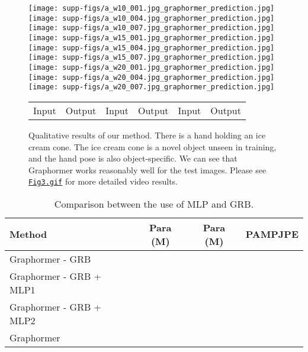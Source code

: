 \begin{figure*}
\begin{center}
\texttt{[image: supp-figs/a\_w10\_001.jpg\_graphormer\_prediction.jpg]}
\texttt{[image: supp-figs/a\_w10\_004.jpg\_graphormer\_prediction.jpg]}
\texttt{[image: supp-figs/a\_w10\_007.jpg\_graphormer\_prediction.jpg]}
\texttt{[image: supp-figs/a\_w15\_001.jpg\_graphormer\_prediction.jpg]}
\texttt{[image: supp-figs/a\_w15\_004.jpg\_graphormer\_prediction.jpg]}
\texttt{[image: supp-figs/a\_w15\_007.jpg\_graphormer\_prediction.jpg]}
\texttt{[image: supp-figs/a\_w20\_001.jpg\_graphormer\_prediction.jpg]}
\texttt{[image: supp-figs/a\_w20\_004.jpg\_graphormer\_prediction.jpg]}
\texttt{[image: supp-figs/a\_w20\_007.jpg\_graphormer\_prediction.jpg]}
\vspace{-2mm}
\setlength{\tabcolsep}{30pt}
\begin{tabular}{cccccc}
Input & Output &  Input & Output &  Input & Output
\end{tabular}
\caption{
Qualitative results of our method. There is a hand holding an ice cream cone. The ice cream cone is a novel object unseen in training, and the hand pose is also object-specific. We can see that Graphormer works reasonably well for the test images. Please see  \href{https://github.com/microsoft/MeshGraphormer/blob/main/docs/Fig3.gif}{\texttt{Fig3.gif}} for more detailed video results.
} 
\label{fig:vis_hand_3}
\vspace{-2mm}
\end{center}
\end{figure*} 

\begin{table*}
\centering
\begin{tabular}{lccc}
    \toprule
	Method  & Para (M) &  Para (M) & PAMPJPE  \\
	\midrule
	Graphormer - GRB &  &  & \\
	Graphormer - GRB + MLP1 &  &  & \\
    Graphormer - GRB + MLP2 &  &  & \\
	\midrule
	Graphormer &  &  & \\
	\bottomrule
\end{tabular}
\caption{Comparison between the use of MLP and GRB.}
\label{tbl:mlp}
\vspace{-2mm}
\end{table*}


